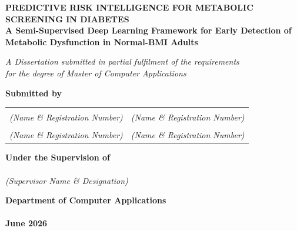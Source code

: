 \documentclass[12pt,a4paper,oneside]{report}
\begin{document}

\begin{titlepage}
\centering
\vspace*{1cm}

{\Large\bfseries
PREDICTIVE RISK INTELLIGENCE FOR METABOLIC SCREENING IN DIABETES\\[6pt]
{\large A Semi-Supervised Deep Learning Framework for Early Detection of\\[2pt]
Metabolic Dysfunction in Normal-BMI Adults}
\par}

\vspace{1.5cm}
\textit{A Dissertation submitted in partial fulfilment of the requirements\\
for the degree of Master of Computer Applications}

\vspace{1.5cm}
\textbf{Submitted by}\\[8pt]
\begin{tabular}{ll}
\underline{\hspace{5.5cm}} & \underline{\hspace{5.5cm}} \\
\textit{(Name \& Registration Number)} & \textit{(Name \& Registration Number)} \\[10pt]
\underline{\hspace{5.5cm}} & \underline{\hspace{5.5cm}} \\
\textit{(Name \& Registration Number)} & \textit{(Name \& Registration Number)}
\end{tabular}

\vspace{1.5cm}
\textbf{Under the Supervision of}\\[6pt]
\underline{\hspace{8cm}}\\[4pt]
\textit{(Supervisor Name \& Designation)}

\vspace{1.5cm}
\textbf{Department of Computer Applications}\\
\underline{\hspace{8cm}}\\[6pt]
\textbf{June 2026}

\end{titlepage}
\end{document}
